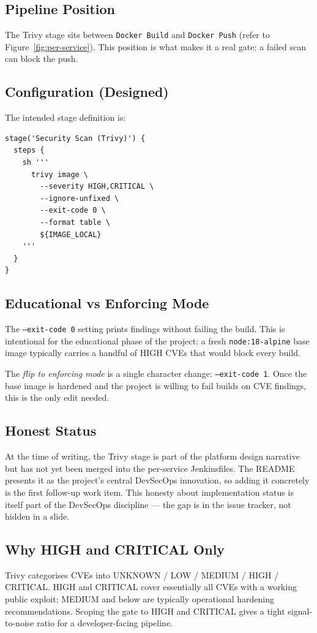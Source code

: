 \documentclass[11pt,a4paper]{article}
\begin{document}
\subsection{Pipeline Position}
The Trivy stage sits between \texttt{Docker Build} and
\texttt{Docker Push} (refer to Figure~\ref{fig:per-service}).  This
position is what makes it a real gate: a failed scan can block the
push.

\subsection{Configuration (Designed)}
The intended stage definition is:

\begin{lstlisting}
stage('Security Scan (Trivy)') {
  steps {
    sh '''
      trivy image \
        --severity HIGH,CRITICAL \
        --ignore-unfixed \
        --exit-code 0 \
        --format table \
        ${IMAGE_LOCAL}
    '''
  }
}
\end{lstlisting}

\subsection{Educational vs Enforcing Mode}
The \texttt{--exit-code 0} setting prints findings without failing
the build.  This is intentional for the educational phase of the
project: a fresh \texttt{node:18-alpine} base image typically carries
a handful of HIGH CVEs that would block every build.

The \emph{flip to enforcing mode} is a single character change:
\texttt{--exit-code 1}.  Once the base image is hardened and the
project is willing to fail builds on CVE findings, this is the only
edit needed.

\subsection{Honest Status}
At the time of writing, the Trivy stage is part of the platform
design narrative but has not yet been merged into the per-service
Jenkinsfiles.  The README presents it as the project's central
DevSecOps innovation, so adding it concretely is the first follow-up
work item.  This honesty about implementation status is itself part
of the DevSecOps discipline — the gap is in the issue tracker, not
hidden in a slide.

\subsection{Why HIGH and CRITICAL Only}
Trivy categorises CVEs into UNKNOWN / LOW / MEDIUM / HIGH /
CRITICAL.  HIGH and CRITICAL cover essentially all CVEs with a
working public exploit; MEDIUM and below are typically operational
hardening recommendations.  Scoping the gate to HIGH and CRITICAL
gives a tight signal-to-noise ratio for a developer-facing pipeline.
\end{document}
